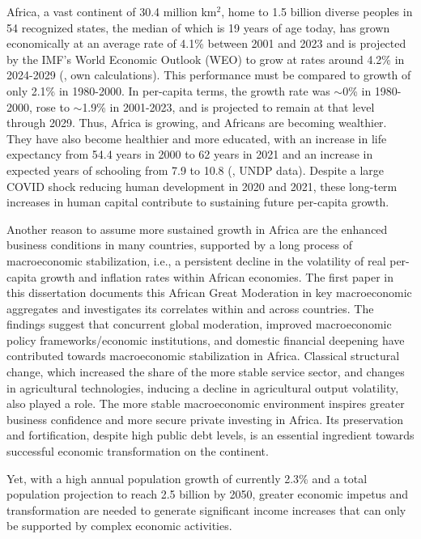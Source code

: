 \documentclass[a4paper]{article}
\begin{document}

Africa, a vast continent of 30.4 million km$^2$, home to 1.5 billion diverse peoples in 54 recognized states, the median of which is 19 years of age today, has grown economically at an average rate of 4.1\% between 2001 and 2023 and is projected by the IMF's World Economic Outlook (WEO) to grow at rates around 4.2\% in 2024-2029 (\citet{krantz2023africamonitor}, own calculations). This performance must be compared to growth of only 2.1\% in 1980-2000. In per-capita terms, the growth rate was $\sim$0\% in 1980-2000, rose to $\sim$1.9\% in 2001-2023, and is projected to remain at that level through 2029. Thus, Africa is growing, and Africans are becoming wealthier. They have also become healthier and more educated, with an increase in life expectancy from  54.4 years in 2000 to 62 years in 2021 and an increase in expected years of schooling from 7.9 to 10.8 (\citet{krantz2023africamonitor}, UNDP data). Despite a large COVID shock reducing human development in 2020 and 2021, these long-term increases in human capital contribute to sustaining future per-capita growth. \newline 

Another reason to assume more sustained growth in Africa are the enhanced business conditions in many countries, supported by a long process of macroeconomic stabilization, i.e., a persistent decline in the volatility of real per-capita growth and inflation rates within African economies. The first paper in this dissertation \citep{krantz2023africas} documents this African Great Moderation in key macroeconomic aggregates and investigates its correlates within and across countries. The findings suggest that concurrent global moderation, improved macroeconomic policy frameworks/economic institutions, and domestic financial deepening have contributed towards macroeconomic stabilization in Africa. Classical structural change, which increased the share of the more stable service sector, and changes in agricultural technologies, inducing a decline in agricultural output volatility, also played a role. The more stable macroeconomic environment inspires greater business confidence and more secure private investing in Africa. Its preservation and fortification, despite high public debt levels, is an essential ingredient towards successful economic transformation on the continent. \newline 

Yet, with a high annual population growth of currently 2.3\% and a total population projection to reach 2.5 billion by 2050, greater economic impetus and transformation are needed to generate significant income increases that can only be supported by complex economic activities. \newline 
\end{document}
